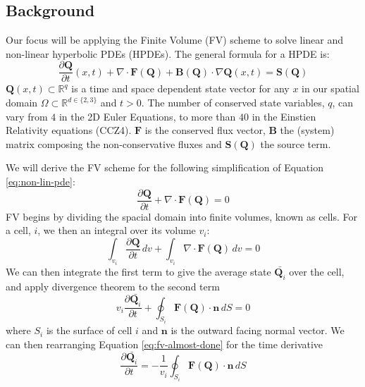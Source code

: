 \subsection{Background}
Our focus will be applying the Finite Volume (FV) scheme to solve linear and non-linear hyperbolic PDEs (HPDEs).
The general formula for a HPDE is:
\begin{equation}\label{eq:non-lin-pde}
    \frac{\partial \mathbf{Q}}{\partial t}(x,t) + \nabla \cdot \mathbf{F}(\mathbf{Q}) + \mathbf{B}(\mathbf{Q}) \cdot \nabla \mathbf{Q}(x,t) = \mathbf{S}(\mathbf{Q})
\end{equation}
$\mathbf{Q}(x,t)\subset \mathbb{R}^q$ is a time and space dependent state vector for any $x$ in our spatial domain $\Omega\subset \mathbb{R}^{d \in \{2,3\}}$ and $t>0$.
The number of conserved state variables, $q$, can vary from $4$ in the 2D Euler Equations, to more than $40$ in the Einstien Relativity equations (CCZ4).
$\mathbf{F}$ is the conserved flux vector, $\mathbf{B}$ the (system) matrix composing the non-conservative fluxes and $\mathbf{S}(\mathbf{Q})$ the source term.


We will derive the FV scheme for the following simplification of Equation \ref{eq:non-lin-pde}:
\begin{equation}
    \frac{\partial \mathbf{Q}}{\partial t} + \nabla\cdot \mathbf{F}(\mathbf{Q}) = 0
\end{equation}
FV begins by dividing the spacial domain into finite volumes, known as cells.
For a cell, $i$, we then an integral over its volume $v_i$:
\begin{equation}
    \int_{v_i}\frac{\partial \mathbf{Q}}{\partial t}\,dv + \int_{v_i}\nabla\cdot \mathbf{F}(\mathbf{Q})\,dv = 0
\end{equation}
We can then integrate the first term to give the average state $\bar{\mathbf{Q}_i}$ over the cell, and apply divergence theorem to the second term
\begin{equation}\label{eq:fv-almost-done}
    v_i\frac{\partial \bar{\mathbf{Q}_i}}{\partial t} + \oint_{S_i}\mathbf{F}(\mathbf{Q})\cdot \mathbf{n} \, dS = 0
\end{equation}
where $S_i$ is the surface of cell $i$ and $\mathbf{n}$ is the outward facing normal vector.
We can then rearranging Equation \ref{eq:fv-almost-done} for the time derivative
\begin{equation}
   \frac{\partial \bar{\mathbf{Q}_i}}{\partial t} = -\frac{1}{v_i} \oint_{S_i}\mathbf{F}(\mathbf{Q})\cdot \mathbf{n} \, dS
\end{equation}

